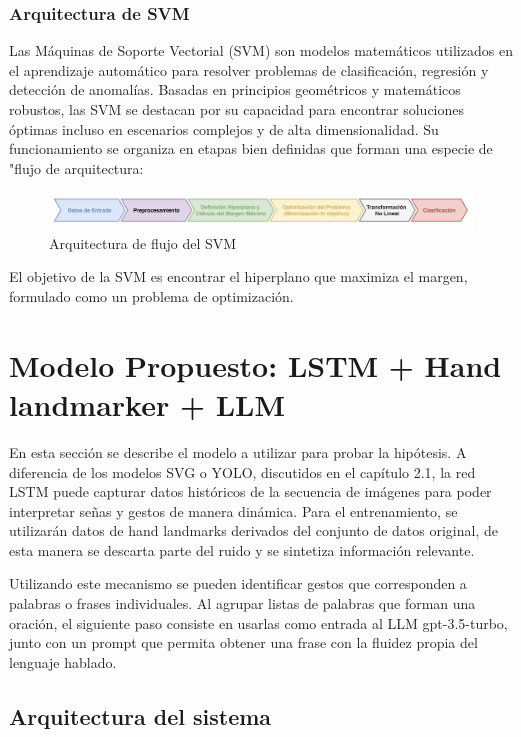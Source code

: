 \documentclass{article}
\begin{document}
\subsubsection{Arquitectura de SVM}

Las Máquinas de Soporte Vectorial (SVM) son modelos matemáticos utilizados en el aprendizaje automático para resolver problemas de clasificación, regresión y detección de anomalías. Basadas en principios geométricos y matemáticos robustos, las SVM se destacan por su capacidad para encontrar soluciones óptimas incluso en escenarios complejos y de alta dimensionalidad.  Su funcionamiento se organiza en etapas bien definidas que forman una especie de "flujo de arquitectura:

\begin{figure}[!hbtp]
    \centering
    \includegraphics[width=5in]{figuras/flujoSVM.png}
		\caption{Arquitectura de flujo del SVM}
		\label{fig6}
\end{figure}

El objetivo de la SVM es encontrar el hiperplano que maximiza el margen, formulado como un problema de optimización.


\section{Modelo Propuesto: LSTM + Hand landmarker + LLM}

En esta sección se describe el modelo a utilizar para probar la hipótesis. A diferencia de los modelos SVG o YOLO, discutidos en el capítulo 2.1, la red LSTM puede capturar datos históricos de la secuencia de imágenes para poder interpretar señas y gestos de manera dinámica. Para el entrenamiento, se utilizarán datos de hand landmarks derivados del conjunto de datos original, de esta manera se descarta parte del ruido y se sintetiza información relevante.

Utilizando este mecanismo se pueden identificar gestos que corresponden a palabras o frases individuales. Al agrupar listas de palabras que forman una oración, el siguiente paso consiste en usarlas como entrada al LLM gpt-3.5-turbo, junto con un prompt que permita obtener una frase con la fluidez propia del lenguaje hablado.

\subsection{Arquitectura del sistema}
\end{document}
